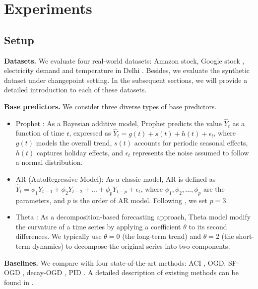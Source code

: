 \section{Experiments}
\vspace{-0.5em}
\label{experiment}
\subsection{Setup}
\vspace{-0.5em}
\textbf{Datasets.}
We evaluate four real-world datasets: Amazon stock, Google stock \citep{cam2018stock}, electricity demand \citep{harries1999splice} and temperature in Delhi \citep{sumanth2017climate}. Besides, we evaluate the synthetic dataset under changepoint setting. In the subsequent sections, we will provide a detailed introduction to each of these datasets.


\textbf{Base predictors.}
We consider three diverse types of base predictors.

\begin{itemize}
    \item Prophet \citep{taylor2018forecasting}: As a Bayesian additive model, Prophet predicts the value $\hat{Y}_t$ as a function of time $t$, expressed as $\hat{Y}_t = g(t) + s(t) + h(t) + \epsilon_t$, where $g(t)$ models the overall trend, $s(t)$ accounts for periodic seasonal effects, $h(t)$ captures holiday effects, and $\epsilon_t$ represents the noise assumed to follow a normal distribution.
    \item AR (AutoRegressive Model): As a classic model, AR is defined as $\hat{Y}_t = \phi_1 Y_{t-1} +\phi_2 Y_{t-2} + ... + \phi_p Y_{t-p} + \epsilon_t$, where $\phi_1, \phi_2,..., \phi_p$ are the parameters, and $p$ is the order of AR model. Following \cite{pid_angelopoulos2024conformal}, we set $p=3$.
    \item Theta \citep{assimakopoulos2000theta}: As a decomposition-based forecasting approach, Theta model modify the curvature of a time series by applying a coefficient $\theta$ to its second differences. We typically use $\theta=0$ (the long-term trend) and $\theta=2$ (the short-term dynamics) to decompose the original series into two components.
\end{itemize}

\textbf{Baselines.}
We compare with four state-of-the-art methods: ACI \citep{aci_gibbs2021adaptive}, OGD, SF-OGD \citep{bhatnagar2023improved}, decay-OGD  \citep{angelopoulos2024online}, PID \citep{pid_angelopoulos2024conformal}. A detailed description of existing methods can be found in .

